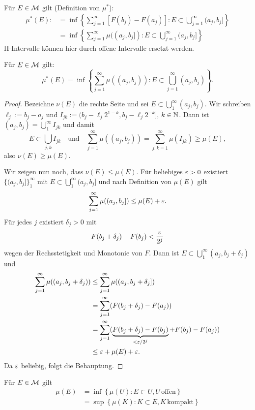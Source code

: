 Für $E \in \mathcal{M}$ gilt (Definition von $\mu^*$):
\[ \begin{aligned} \mu^*(E) 
    :&= \inf \left\{ \sum_{j=1}^\infty [ F(b_j) - F(a_j) ] : E \subset \bigcup_{j=1}^\infty (a_j,b_j] \right\} \\
     &= \inf \left\{ \sum_{j=1}^\infty \mu((a_j,b_j]) : E \subset \bigcup_{j=1}^\infty (a_j,b_j] \right\}
   \end{aligned} \]
H-Intervalle können hier durch offene Intervalle ersetzt werden.

\begin{lem}
 Für $E \in \mathcal{M}$ gilt:
 \[ \mu^*(E) = \inf \left\{ \sum_{j=1}^\infty \mu((a_j,b_j)) : E \subset \bigcup_{j=1}^\infty (a_j,b_j) \right\}. \]
\end{lem}

\begin{proof}
 Bezeichne $\nu(E)$ die rechte Seite und sei $E \subset \bigcup_1^\infty (a_j,b_j)$. Wir schreiben $\ell_j := b_j - a_j$ und $I_{jk} := (b_j -\ell_j 2^{1-k}, b_j - \ell_j 2^{-k}]$, $k \in \mathbb{N}$. Dann ist $(a_j,b_j) = \bigcup_1^\infty I_{jk}$ und damit 
 \[ E \subset \bigcup_{j,k} I_{jk} \quad \text{und} \quad \sum_{j=1}^\infty \mu( (a_j, b_j) ) = \sum_{j,k=1}^\infty \mu(I_{jk}) \ge \mu(E), \]
 also $\nu(E) \ge \mu(E)$.
 
 Wir zeigen nun noch, dass $\nu(E) \le \mu(E)$. Für beliebiges $\varepsilon > 0$ existiert $\{ (a_j, b_j] \}_1^\infty$ mit $E \subset \bigcup_1^\infty (a_j,b_j]$ und nach Definition von $\mu(E)$ gilt
 \[ \sum_{j=1}^\infty \mu((a_j,b_j]) \le \mu(E) + \varepsilon. \]
 Für jedes $j$ existiert $\delta_j > 0$ mit
 \[ F( b_j + \delta_j ) - F(b_j) < \frac{\varepsilon}{2^j} \]
 wegen der Rechsstetigkeit und Monotonie von $F$. Dann ist $E \subset \bigcup_1^\infty (a_j, b_j + \delta_j )$ und
 \[ \begin{aligned}
     \sum_{j=1}^\infty \mu((a_j,b_j+\delta_j)) 
     &\le \sum_{j=1}^\infty \mu((a_j,b_j+\delta_j]) \\
     &=   \sum_{j=1}^\infty ( F(b_j + \delta_j) - F(a_j) ) \\
     &=   \sum_{j=1}^\infty ( \underbrace{F(b_j + \delta_j) - F(b_j)}_{< \varepsilon/2^j} + F(b_j) - F(a_j) ) \\
     &\le \varepsilon + \mu(E) + \varepsilon.
    \end{aligned} \]
 Da $\varepsilon$ beliebig, folgt die Behauptung.
\end{proof}

\begin{thm}
 Für $E \in \mathcal{M}$ gilt
 \[ \begin{aligned}
    \mu(E) &= \inf \left\{ \mu(U) : E \subset U, U\, \text{offen} \right\} \\
           &= \sup \left\{ \mu(K) : K \subset E, K\, \text{kompakt} \right\} 
    \end{aligned} \]
\end{thm}

